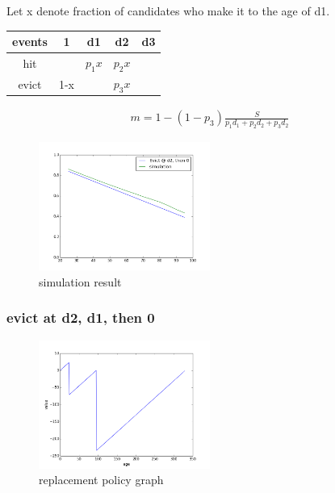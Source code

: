 \documentclass[12pt, letterpaper]{article}
\begin{document}
Let x denote fraction of candidates who make it to the age of d1.

\begin{center}
\begin{tabular}{c | c c c c}
\hline
events & 1 & d1 & d2 & d3 \\
\hline
hit & & $p_1 x$ & $p_2 x$ &  \\
evict & 1-x & & $p_3 x$ & 
\end{tabular}
\end{center}

\begin{equation}
\begin{aligned}
m = 1 - (1-p_3) \frac{S}{p_1 d_1 + p_2 d_2 + p_3 d_2}
\end{aligned}
\end{equation}

\begin{figure}[H]
\centering
\includegraphics[width=0.5\textwidth]{sim_d2.png}
\caption{simulation result}
\end{figure}

\subsubsection{evict at d2, d1, then 0}

\begin{figure}[H]
\centering
\includegraphics[width=0.5\textwidth]{evict_d2_d1.png}
\caption{replacement policy graph}
\end{figure}
\end{document}
